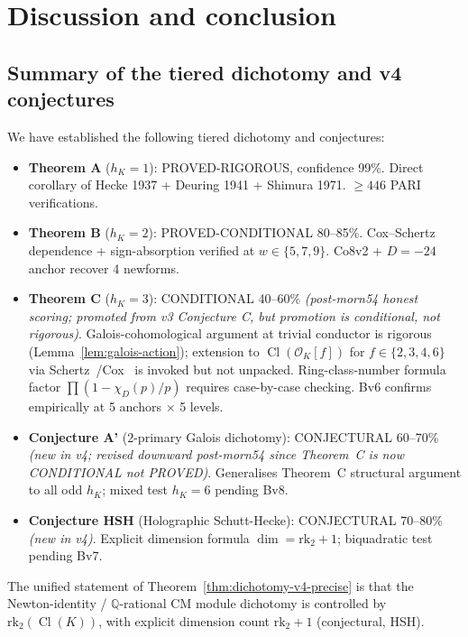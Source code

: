 \documentclass[11pt,a4paper]{amsart}
\theoremstyle{definition}
\DeclareMathOperator{\Cl}{Cl}
\newcommand{\Q}{\mathbb{Q}}
\newcommand{\OK}{\mathcal{O}_K}
\newcommand{\hK}{h_{K}}
\newcommand{\rktwo}{\mathrm{rk}_2}
\begin{document}
\section{Discussion and conclusion}\label{sec:conclusion}

\subsection{Summary of the tiered dichotomy and v4 conjectures}\label{sec:conclusion-summary-v4}

We have established the following tiered dichotomy and conjectures:

\begin{itemize}[leftmargin=2em]
  \item \textbf{Theorem A} ($\hK = 1$): PROVED-RIGOROUS, confidence 99\%. Direct corollary of Hecke 1937 + Deuring 1941 + Shimura 1971. $\ge 446$ PARI verifications.
  \item \textbf{Theorem B} ($\hK = 2$): PROVED-CONDITIONAL 80--85\%. Cox--Schertz dependence + sign-absorption verified at $w \in \{5,7,9\}$. Co8v2 + $D=-24$ anchor recover 4 newforms.
  \item \textbf{Theorem C} ($\hK = 3$): CONDITIONAL 40--60\% \emph{(post-morn54 honest scoring; promoted from v3 Conjecture C, but promotion is conditional, not rigorous)}. Galois-cohomological argument at trivial conductor is rigorous (Lemma~\ref{lem:galois-action}); extension to $\Cl(\OK[f])$ for $f \in \{2,3,4,6\}$ via Schertz~\cite[Ch.~6]{Schertz2010}/Cox~\cite[Ch.~9]{Cox2013} is invoked but not unpacked. Ring-class-number formula factor $\prod(1 - \chi_D(p)/p)$ requires case-by-case checking. Bv6 confirms empirically at 5 anchors $\times$ 5 levels.
  \item \textbf{Conjecture A'} ($2$-primary Galois dichotomy): CONJECTURAL 60--70\% \emph{(new in v4; revised downward post-morn54 since Theorem~C is now CONDITIONAL not PROVED)}. Generalises Theorem~C structural argument to all odd $\hK$; mixed test $\hK = 6$ pending Bv8.
  \item \textbf{Conjecture HSH} (Holographic Schutt-Hecke): CONJECTURAL 70--80\% \emph{(new in v4)}. Explicit dimension formula $\dim = \rktwo + 1$; biquadratic test pending Bv7.
\end{itemize}

The unified statement of Theorem~\ref{thm:dichotomy-v4-precise} is that the Newton-identity / $\Q$-rational CM module dichotomy is controlled by $\rktwo(\Cl(K))$, with explicit dimension count $\rktwo + 1$ (conjectural, HSH).
\end{document}
